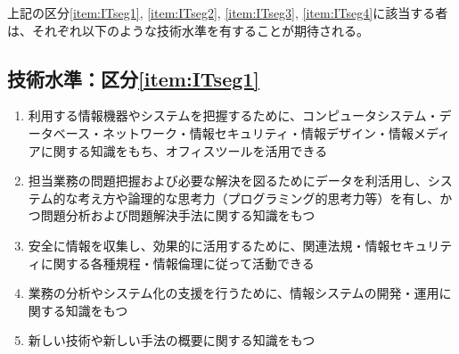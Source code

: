 \clearpage
上記の区分\ref{item:ITseg1}, \ref{item:ITseg2}, \ref{item:ITseg3}, \ref{item:ITseg4}\hx に該当する者は、それぞれ以下のような技術水準を有することが期待される。

\subsection{技術水準：区分\ref{item:ITseg1}}
\begin{enumerate}[label=\sarrow]
\item 利用する情報機器やシステムを把握するために、コンピュータシステム・データベース・ネットワーク・情報セキュリティ・情報デザイン・情報メディアに関する知識をもち、オフィスツールを活用できる
\item 担当業務の問題把握および必要な解決を図るためにデータを利活用し、システム的な考え方や論理的な思考力（プログラミング的思考力等）を有し、かつ問題分析および問題解決手法に関する知識をもつ
\item 安全に情報を収集し、効果的に活用するために、関連法規・情報セキュリティに関する各種規程・情報倫理に従って活動できる
\item 業務の分析やシステム化の支援を行うために、情報システムの開発・運用に関する知識をもつ
\item 新しい技術や新しい手法の概要に関する知識をもつ
\end{enumerate}

